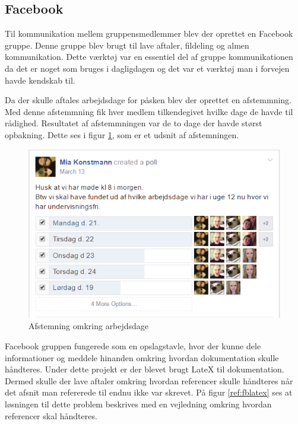 \subsection{Facebook}
Til kommunikation mellem gruppensmedlemmer blev der oprettet en Facebook gruppe. Denne gruppe blev brugt til lave aftaler, fildeling og almen kommunikation. Dette værktøj var en essentiel del af gruppe kommunikationen da det er noget som bruges i dagligdagen og det var et værktøj man i forvejen havde kendskab til. \newline

Da der skulle aftales arbejdsdage for påsken blev der oprettet en afstemmning. Med denne afstemmning fik hver medlem tilkendegivet hvilke dage de havde til rådighed. Resultatet af afstemmningen var de to dage der havde størst opbakning. Dette ses i figur \ref{ref:fbpoll}, som er et udsnit af afstemningen.
\begin{figure}[H]
	\centering
	\includegraphics[scale=0.6]{Projektgennemfoerelse/images/fbpoll}
	\caption{Afstemning omkring arbejdsdage}
	\label{ref:fbpoll}
\end{figure}

Facebook gruppen fungerede som en opslagstavle, hvor der kunne dele informationer og meddele hinanden omkring hvordan dokumentation skulle håndteres. Under dette projekt er der blevet brugt LateX til dokumentation. Dermed skulle der lave aftaler omkring hvordan referencer skulle håndteres når det afsnit man refererede til endnu ikke var skrevet. På figur \ref{ref:fblatex} ses at løsningen til dette problem beskrives med en vejledning omkring hvordan referencer skal håndteres.

